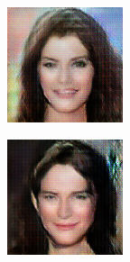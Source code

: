 \documentclass{article}
\begin{document}
\begin{center}
\begin{minipage}{0.24\linewidth}
\end{minipage}
\begin{minipage}{0.24\linewidth}
\includegraphics[width=\textwidth]{samples_16_288.png}
\end{minipage}
\begin{minipage}{0.24\linewidth}
\includegraphics[width=\textwidth]{samples_16_306.png}

\end{minipage}
\end{center}
\end{document}
